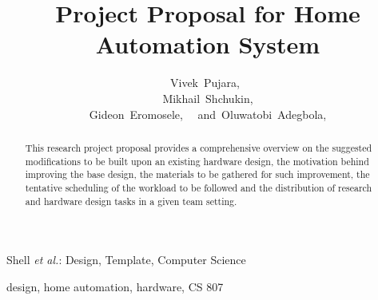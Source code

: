 \documentclass[journal]{IEEEtran}
\begin{document}

\title{Project Proposal for Home Automation System}

\author{Vivek~Pujara,~
\\~Mikhail~Shchukin,~
\\~Gideon~Eromosele,~
~and~Oluwatobi~Adegbola,~
}


%
{Shell \MakeLowercase{\textit{et al.}}: Design, Template, Computer Science }


\maketitle

\begin{abstract}
This research project proposal provides a comprehensive overview on the
suggested modifications to be built upon an existing hardware design,
the motivation behind improving the base design, the materials
to be gathered for such improvement, the tentative scheduling of
the workload to be followed and the distribution of research and
hardware design tasks in a given team setting.
\end{abstract}

\begin{IEEEkeywords}
design, home automation, hardware, CS 807
\end{IEEEkeywords}



%
\IEEEpeerreviewmaketitle
\end{document}
